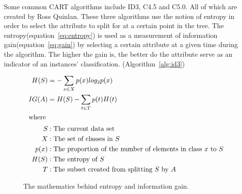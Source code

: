 	\bigskip\noindent
	Some common CART algorithms include ID3, C4.5 and C5.0. 
	All of which are created by Ross Quinlan\cite{quinlan:id3, quinlan:c45}.
	These three algorithms use the notion of entropy in order to select the attribute to split for at a certain point in the tree. 
	The entropy(equation~\ref{eq:entropy}) is used as a measurement of information gain(equation~\ref{eq:gain}) by selecting a certain attribute at a given time during the algorithm. 
	The higher the gain is, the better do the attribute serve as an indicator of an instances' classification. (Algorithm~\ref{alg:id3})
	\begin{figure}[ht]
		\begin{align}
			H(S) &= -\sum_{x \in X}p(x)log_2p(x)\label{eq:entropy}\\
			IG(A) &= H(S) - \sum_{t \in T}p(t)H(t)\label{eq:gain}\\
			\intertext{where}
			S &: \text{The current data set}\nonumber\\
			X &: \text{The set of classes in $S$}\nonumber\\
			p(x) &: \text{The proportion of the number of elements in class $x$ to $S$}\nonumber\\
			H(S) &: \text{The entropy of $S$}\nonumber\\
			T &:	 \text{The subset created from splitting $S$ by $A$}\nonumber
		\end{align}
		\caption{The mathematics behind entropy and information gain.}
	\end{figure}
